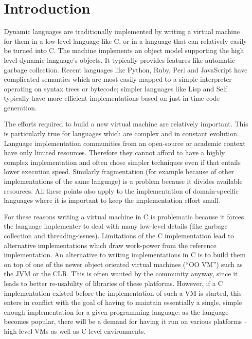 \documentclass{llncs}
\begin{document}
\section{Introduction}

Dynamic languages are traditionally implemented by writing a virtual
machine for them in a low-level language like C, or in a language that
can relatively easily be turned into C.  The machine implements an
object model supporting the high level dynamic language's objects.  It
typically provides features like automatic garbage collection.  Recent
languages like Python, Ruby, Perl and JavaScript have complicated
semantics which are most easily mapped to a simple interpreter operating
on syntax trees or bytecode; simpler languages like Lisp and Self
typically have more efficient implementations based on just-in-time code
generation.

The efforts required to build a new virtual machine are relatively
important.  This is particularly true for languages which are complex
and in constant evolution. Language implementation communities from an
open-source or academic context have only limited resources. Therefore they
cannot afford to have a highly complex implementation and often chose simpler
techniques even if that entails lower execution speed. Similarly fragmentation
(for example because of other implementations of the same language) is a
problem because it divides available resources. All these points also apply to
the implementation of domain-specific languages where it is important to keep
the implementation effort small.

For these reasons writing a virtual machine in C is problematic because it
forces the language implementer to deal with many low-level details (like
garbage collection and threading-issues). Limitations
of the C implementation lead to alternative implementations which draw
work-power from the reference implementation. An alternative to writing
implementations in C is to build them on top of one of the newer object oriented
virtual machines (``OO VM'') such as the JVM or the CLR. This is often wanted by
the community anyway, since it leads to better re-usability of libraries of
these platforms. However, if a C implementation existed before the
implementation of such a VM is started, this enters in conflict with the goal of
having to maintain essentially a single, simple enough implementation for a
given programming language: as the language becomes popular, there will be a
demand for having it run on various platforms -- high-level VMs as well as
C-level environments.
\end{document}
